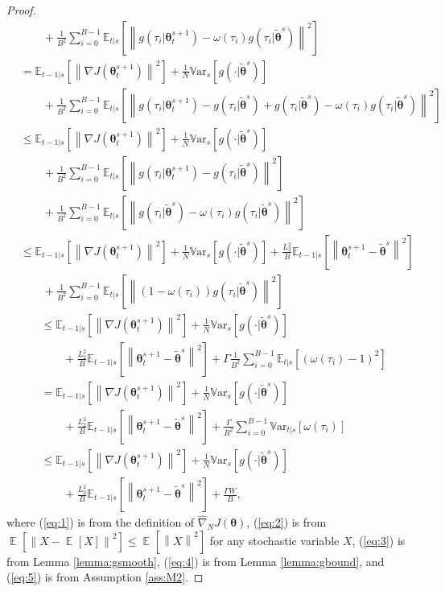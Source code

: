 \documentclass{article}
\theoremstyle{remark}
\theoremstyle{definition}
\DeclareMathOperator*{\EV}{\mathbb{E}}
\newcommand{\EVV}[2][\ppvect \in \ppspace]{\EV_{#1}\left[{#2}\right]}
\newcommand{\norm}[2][\infty]{\left\|#2\right\|_{#1}}
\newcommand{\vtheta}{\boldsymbol{\theta}}
\newcommand{\gradJ}[1]{\nabla J(#1)}
\newcommand{\gradApp}[2]{\widehat{\nabla}_{#2}J(#1)}
\newcommand{\Ets}[2][t]{\mathbb{E}_{#1\vert s}\left[#2\right]}
\newcommand{\Varts}[2][t]{{\mathbb{V}\text{ar}}_{#1\vert s}\left[#2\right]}
\newcommand{\Vars}[1]{{\mathbb{V}\text{ar}}_{s}\left[#1\right]}
\newcommand{\VARIS}{W}
\begin{document}
\begin{proof}
\begin{align}
	&\qquad+
			\frac{1}{B^2}\sum_{i=0}^{B-1}
			\Ets{\norm[]{
			g(\tau_i\vert\vtheta_t^{s+1}) -
			\omega(\tau_i)g(\tau_i\vert\tilde{\vtheta}^s)}^2} \nonumber\\
	&= \Ets[t-1]{\norm[]{\gradJ{\vtheta_t^{s+1}}}^2} 
	+\frac{1}{N}\Vars{g(\cdot\vert\tilde{\vtheta}^s)}
	\nonumber\\
	&\qquad+
			\frac{1}{B^2}\sum_{i=0}^{B-1}
			\Ets{\norm[]{g(\tau_i\vert\vtheta_t^{s+1})
			-g(\tau_i\vert\tilde{\vtheta}^s)
			+g(\tau_i\vert\tilde{\vtheta}^s) 
			-\omega(\tau_i)g(\tau_i\vert\tilde{\vtheta}^s)}^2} \nonumber\\
	&\leq \Ets[t-1]{\norm[]{\gradJ{\vtheta_t^{s+1}}}^2} 
	+\frac{1}{N}\Vars{g(\cdot\vert\tilde{\vtheta}^s)}
	\nonumber\\
	&\qquad+
			\frac{1}{B^2}\sum_{i=0}^{B-1}
			\Ets{\norm[]{g(\tau_i\vert\vtheta_t^{s+1})
			-g(\tau_i\vert\tilde{\vtheta}^s)}^2} \nonumber\\
	&\qquad
			+\frac{1}{B^2}\sum_{i=0}^{B-1}
			\Ets{\norm[]{g(\tau_i\vert\tilde{\vtheta}^s) 
			-\omega(\tau_i)g(\tau_i\vert\tilde{\vtheta}^s)}^2} \nonumber\\
	&\leq \Ets[t-1]{\norm[]{\gradJ{\vtheta_t^{s+1}}}^2} 
	+\frac{1}{N}\Vars{g(\cdot\vert\tilde{\vtheta}^s)}
	+\frac{L_2^2}{B}\Ets[t-1]{\norm[]{\vtheta_t^{s+1}-\tilde{\vtheta}^s}^2}\nonumber\\
	&\qquad+
		\frac{1}{B^2}\sum_{i=0}^{B-1}
		\Ets{\norm[]{(1 
			-\omega(\tau_i))g(\tau_i\vert\tilde{\vtheta}^s)}^2} \label{eq:3}
\end{align}
\begin{align}
	&\leq \Ets[t-1]{\norm[]{\gradJ{\vtheta_t^{s+1}}}^2} 
	+\frac{1}{N}\Vars{g(\cdot\vert\tilde{\vtheta}^s)}
	\nonumber\\
	&\qquad+\frac{L_2^2}{B}\Ets[t-1]{\norm[]{\vtheta_t^{s+1}-\tilde{\vtheta}^s}^2}
	+\Gamma\frac{1}{B^2}\sum_{i=0}^{B-1}\Ets{(\omega(\tau_i)-1)^2} \label{eq:4}\\
	&= \Ets[t-1]{\norm[]{\gradJ{\vtheta_t^{s+1}}}^2} 
	+\frac{1}{N}\Vars{g(\cdot\vert\tilde{\vtheta}^s)}
	\nonumber\\
	&\qquad+\frac{L_2^2}{B}\Ets[t-1]{\norm[]{\vtheta_t^{s+1}-\tilde{\vtheta}^s}^2}
	+\frac{\Gamma}{B^2}\sum_{i=0}^{B-1}\Varts{\omega(\tau_i)} \nonumber\\
	&\leq \Ets[t-1]{\norm[]{\gradJ{\vtheta_t^{s+1}}}^2} 
	+\frac{1}{N}\Vars{g(\cdot\vert\tilde{\vtheta}^s)}
	\nonumber\\
	&\qquad+\frac{L_2^2}{B}\Ets[t-1]{\norm[]{\vtheta_t^{s+1}-\tilde{\vtheta}^s}^2}
	+\frac{\Gamma\VARIS}{B}, \label{eq:5}
\end{align}
where (\ref{eq:1}) is from the definition of $\gradApp{\vtheta}{N}$, (\ref{eq:2}) is from $\EVV[]{\norm[]{X-\EVV[]{X}}^2}\leq\EVV[]{\norm[]{X}^2}$ for any stochastic variable $X$, (\ref{eq:3}) is from Lemma \ref{lemma:gsmooth}, 
(\ref{eq:4}) is from Lemma \ref{lemma:gbound}, and (\ref{eq:5}) is from Assumption \ref{ass:M2}.
\end{proof}
\end{document}
